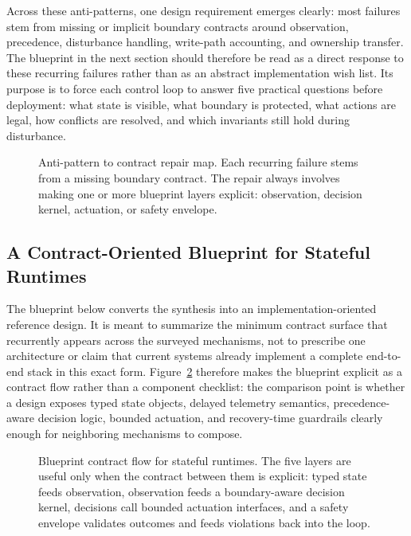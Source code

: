 \documentclass[acmsmall,screen,review]{acmart}
\begin{document}
Across these anti-patterns, one design requirement emerges clearly: most failures stem from missing or implicit boundary contracts around observation, precedence, disturbance handling, write-path accounting, and ownership transfer. The blueprint in the next section should therefore be read as a direct response to these recurring failures rather than as an abstract implementation wish list. Its purpose is to force each control loop to answer five practical questions before deployment: what state is visible, what boundary is protected, what actions are legal, how conflicts are resolved, and which invariants still hold during disturbance.

\begin{figure}[t]
\centering
\resizebox{0.96\textwidth}{!}{}
\caption{Anti-pattern to contract repair map. Each recurring failure stems from a missing boundary contract. The repair always involves making one or more blueprint layers explicit: observation, decision kernel, actuation, or safety envelope.}
\label{fig:antipattern-map}
\end{figure}

\subsection{A Contract-Oriented Blueprint for Stateful Runtimes}

The blueprint below converts the synthesis into an implementation-oriented reference design. It is meant to summarize the minimum contract surface that recurrently appears across the surveyed mechanisms, not to prescribe one architecture or claim that current systems already implement a complete end-to-end stack in this exact form. Figure~\ref{fig:blueprint-flow} therefore makes the blueprint explicit as a contract flow rather than a component checklist: the comparison point is whether a design exposes typed state objects, delayed telemetry semantics, precedence-aware decision logic, bounded actuation, and recovery-time guardrails clearly enough for neighboring mechanisms to compose.

\begin{figure}[t]
\centering
\resizebox{0.97\textwidth}{!}{}
\caption{Blueprint contract flow for stateful runtimes. The five layers are useful only when the contract between them is explicit: typed state feeds observation, observation feeds a boundary-aware decision kernel, decisions call bounded actuation interfaces, and a safety envelope validates outcomes and feeds violations back into the loop.}
\label{fig:blueprint-flow}
\end{figure}
\end{document}
